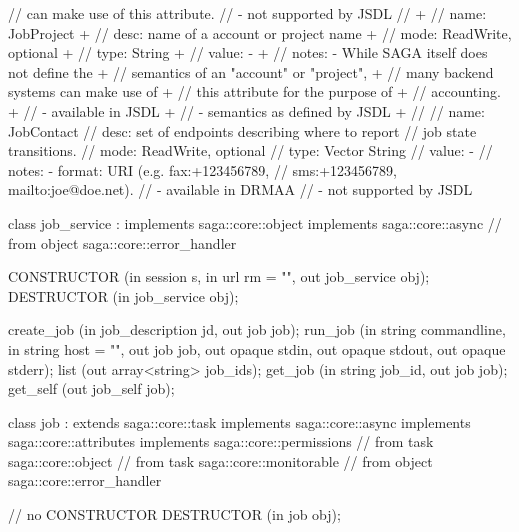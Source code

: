 \begin{myspec}
{{      //            can make use of this attribute. 
      //          - not supported by JSDL
      // 
+     //   name:  JobProject
+     //   desc:  name of a account or project name
+     //   mode:  ReadWrite, optional
+     //   type:  String
+     //   value: -
+     //   notes: - While SAGA itself does not define the 
+     //            semantics of an "account" or "project", 
+     //            many backend systems can make use of
+     //            this attribute for the purpose of 
+     //            accounting.
+     //          - available in JSDL
+     //          - semantics as defined by JSDL
+     // 
      //   name:  JobContact
      //   desc:  set of endpoints describing where to report 
      //          job state transitions.
      //   mode:  ReadWrite, optional
      //   type:  Vector String
      //   value: -
      //   notes: - format: URI (e.g. fax:+123456789, 
      //            sms:+123456789, mailto:joe@doe.net). 
      //          - available in DRMAA
      //          - not supported by JSDL
    }
 
 
    class job_service : implements   saga::core::object
                        implements   saga::core::async
                     // from object  saga::core::error_handler
    {
      CONSTRUCTOR          (in  session         s,
                            in  url             rm = "",
                            out job_service     obj);
      DESTRUCTOR           (in  job_service     obj);
 
      create_job           (in  job_description jd,
                            out job             job);
      run_job              (in  string          commandline,
                            in  string          host = "",
                            out job             job, 
                            out opaque          stdin,
                            out opaque          stdout,
                            out opaque          stderr);
      list                 (out array<string>   job_ids);
      get_job              (in  string          job_id,
                            out job             job);
      get_self             (out job_self        job);
    }
 
 
    class job : extends      saga::core::task
                implements   saga::core::async
                implements   saga::core::attributes
                implements   saga::core::permissions
             // from task    saga::core::object
             // from task    saga::core::monitorable
             // from object  saga::core::error_handler
    {
      // no CONSTRUCTOR
      DESTRUCTOR           (in  job             obj);
 
}}
\end{myspec}
